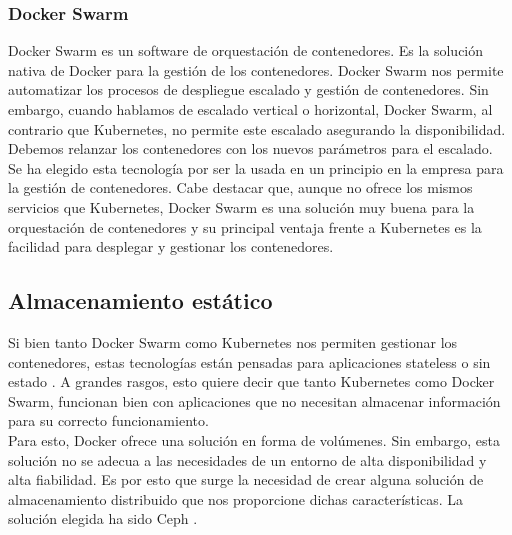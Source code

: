 		\subsubsection{Docker Swarm}
		\begin{text}
			Docker Swarm es un software de orquestación de contenedores. Es la solución nativa de Docker para la gestión de los contenedores. Docker Swarm nos permite automatizar los procesos de despliegue escalado y gestión de contenedores. Sin embargo, cuando hablamos de escalado vertical o horizontal, Docker Swarm, al contrario que Kubernetes, no permite este escalado asegurando la disponibilidad. Debemos relanzar los contenedores con los nuevos parámetros para el escalado. \\
			Se ha elegido esta tecnología por ser la usada en un principio en la empresa para la gestión de contenedores. Cabe destacar que, aunque no ofrece los mismos servicios que Kubernetes, Docker Swarm es una solución muy buena para la orquestación de contenedores y su principal ventaja frente a Kubernetes es la facilidad para desplegar y gestionar los contenedores.
		\end{text}
	\subsection{Almacenamiento estático}
		\label{ceph}
		\begin{text}
			Si bien tanto Docker Swarm como Kubernetes nos permiten gestionar los contenedores, estas tecnologías están pensadas para aplicaciones stateless o sin estado \cite{stateless:online}. A grandes rasgos, esto quiere decir que tanto Kubernetes como Docker Swarm, funcionan bien con aplicaciones que no necesitan almacenar información para su correcto funcionamiento. \\
			Para esto, Docker ofrece una solución en forma de volúmenes. Sin embargo, esta solución no se adecua a las necesidades de un entorno de alta disponibilidad  y alta fiabilidad. Es por esto que surge la necesidad de crear alguna solución de almacenamiento distribuido que nos proporcione dichas características. La solución elegida ha sido Ceph \cite{ceph:online}.
		\end{text}

